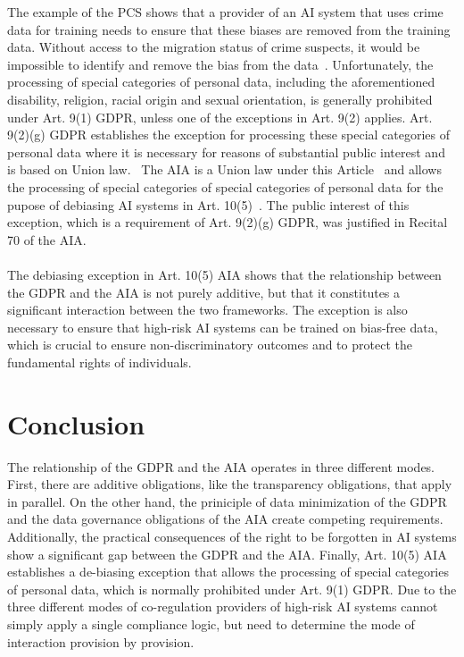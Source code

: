 \documentclass[
	a4paper, %
	10pt, %
	unnumberedsections, %
	twoside, %
]{LTJournalArticle}
\begin{document}
The example of the PCS shows that a provider of an AI system that uses crime data for training needs to ensure that these biases are removed from the training data. Without access to the migration status of crime suspects,
it would be impossible to identify and remove the bias from the data~\cite{VANBEKKUM2025106115}. Unfortunately, the processing of special categories of personal data, including the aforementioned disability, religion, racial origin and sexual orientation,
is generally prohibited under Art. 9(1) GDPR, unless one of the exceptions in Art. 9(2) applies. Art. 9(2)(g) GDPR establishes the exception for processing these special categories of personal data where it is necessary for reasons of substantial
public interest and is based on Union law.~\cite{eugdpr2016} The AIA is a Union law under this Article~\cite{VANBEKKUM2025106115} and allows the processing of special categories of special categories of personal data for
the pupose of debiasing AI systems in Art. 10(5)~\cite{euaiact2024}. The public interest of this exception, which is a requirement of Art. 9(2)(g) GDPR, was justified in Recital 70 of the AIA.\\
\\
The debiasing exception in Art. 10(5) AIA shows that the relationship between the GDPR and the AIA is not purely additive, but that it constitutes a significant interaction between the two frameworks.
The exception is also necessary to ensure that high-risk AI systems can be trained on bias-free data, which is crucial to ensure non-discriminatory outcomes and to protect the fundamental rights of individuals.\\

\section{Conclusion}

The relationship of the GDPR and the AIA operates in three different modes. First, there are additive obligations, like the transparency obligations, that apply in parallel. On the other hand, 
the priniciple of data minimization of the GDPR and the data governance obligations of the AIA create competing requirements. Additionally, the practical consequences of the right to be forgotten in AI systems show a significant gap between the GDPR and the AIA. 
Finally, Art. 10(5) AIA establishes a de-biasing exception that allows the processing of special categories of personal data, which is normally prohibited under Art. 9(1) GDPR.
Due to the three different modes of co-regulation providers of high-risk AI systems cannot simply apply a single compliance logic, but need to determine the mode of interaction provision by provision.\\


\printbibliography %

\end{document}
